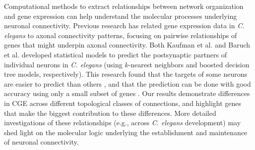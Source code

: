 \documentclass[10pt,letterpaper]{article}
\begin{document}
{Computational methods to extract relationships between network organization and gene expression can help understand the molecular processes underlying neuronal connectivity.
Previous research has related gene expression data in \textit{C. elegans} to axonal connectivity patterns, focusing on pairwise relationships of genes that might underpin axonal connectivity.
Both Kaufman et al. \cite{Kaufman2006} and Baruch et al. \cite{Baruch2008} developed statistical models to predict the postsynaptic partners of individual neurons in \textit{C. elegans} (using $k$-nearest neighbors and boosted decision tree models, respectively).
This research found that the targets of some neurons are easier to predict than others \cite{Kaufman2006}, and that the prediction can be done with good accuracy using only a small subset of genes \cite{Baruch2008}.
Our results demonstrate differences in CGE across different topological classes of connections, and highlight genes that make the biggest contribution to these differences.
More detailed investigations of these relationships (e.g., across \textit{C. elegans} development) may shed light on the molecular logic underlying the establishment and maintenance of neuronal connectivity.

}
\end{document}
